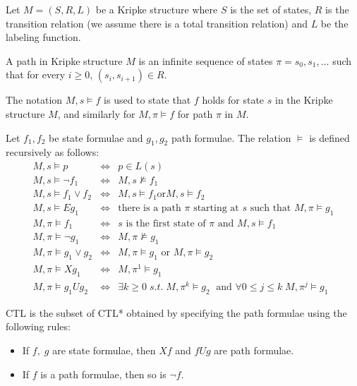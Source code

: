 \documentclass[11pt]{article}
\begin{document}
        Let $M = (S,R,L)$ be a Kripke structure where $S$ is the set of states, $R$
        is the transition relation (we assume there is a total transition relation)
        and $L$ be the labeling function.

        \begin{definition}
            A path in Kripke structure $M$ is an infinite sequence of states 
            $\pi = s_0,s_1,\dots$ such that for every $i\geq 0$, 
            $(s_i, s_{i+1})\in R$.
        \end{definition}

        The notation $M, s \models f$ is used to state that $f$ holds for state
        $s$ in the Kripke structure $M$, and similarly for $M, \pi \models f$ for
        path $\pi$ in $M$.

        \begin{definition}
            Let $f_1, f_2$ be state formulae and $g_1, g_2$ path formulae. 
            The relation $\models$ is defined recursively as follows:
            \begin{eqnarray}
                M,s \models p &\iff & p\in L(s) \\
                M,s \models \neg f_1 &\iff &M,s \not\models f_1 \\
                M,s \models f_1 \vee f_2 &\iff & M,s \models f_1 \text{or} M,s \models f_2 \\
                M,s \models Eg_1 &\iff &\text{there is a path $\pi$ starting at $s$ such
                that $M, \pi \models g_1$}\\
                M, \pi \models f_1 &\iff & s \text{ is the first state of $\pi$ and }
                M,s \models f_1 \\
                M, \pi \models \neg g_1 &\iff &M,\pi \not\models g_1\\
                M,\pi \models g_1 \vee g_2 &\iff & M,\pi \models g_1 \text{ or } M,\pi \models g_2 \\
                M, \pi \models Xg_1 &\iff &M,\pi^1 \models g_1\\
                M,\pi \models g_1Ug_2 &\iff &\exists k\geq 0\; s.t.\; M,\pi^k\models g_2\;
                \text{ and } \forall 0\leq j\leq k\; M,\pi^j \models g_1
            \end{eqnarray}
        \end{definition}

        \begin{definition}
            CTL is the subset of CTL* obtained by specifying the path formulae using
            the following rules\cite{ltl}:
            \begin{itemize}
                \item
                    If $f,\;g$ are state formulae, then $Xf$ and $fUg$ are path
                    formulae.
                \item
                    If $f$ is a path formulae, then so is $\neg f$.
            \end{itemize}
        \end{definition}
\end{document}
